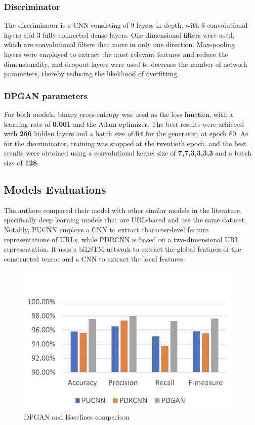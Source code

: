 \subsubsection{Discriminator}
The discriminator is a CNN consisting of 9 layers in depth, with 6 convolutional layers and 3 fully connected dense layers. One-dimensional filters were used, which are convolutional filters that move in only one direction. Max-pooling layers were employed to extract the most relevant features and reduce the dimensionality, and dropout layers were used to decrease the number of network parameters, thereby reducing the likelihood of overfitting.

\subsubsection{DPGAN parameters}
For both models, binary cross-entropy was used as the loss function, with a learning rate of \textbf{0.001} and the Adam optimizer. The best results were achieved with \textbf{256} hidden layers and a batch size of \textbf{64} for the generator, at epoch 80. As for the discriminator, training was stopped at the twentieth epoch, and the best results were obtained using a convolutional kernel size of \textbf{{7,7,3,3,3,3}} and a batch size of \textbf{128}.

\subsection{Models Evaluations}
The authors compared their model with other similar models in the literature, specifically deep learning models that are URL-based and use the same dataset. Notably, PUCNN employs a CNN to extract character-level feature representations of URLs, while PDRCNN is based on a two-dimensional URL representation. It uses a biLSTM network to extract the global features of the constructed tensor and a CNN to extract the local features. 

\begin{figure}[htp]
    \centering
    \includegraphics[width=0.8\linewidth]{images/DPGAN comparisongraph.png}
    \caption{DPGAN and Baselines comparison}
    \label{fig:DPGAN and Baselines comparison}
\end{figure}

